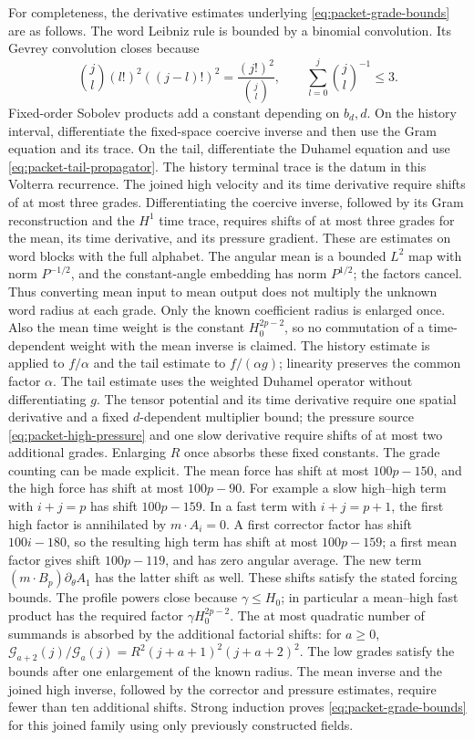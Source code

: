 \documentclass[11pt]{article}
\theoremstyle{definition}
\begin{document}
For completeness, the derivative estimates underlying
\eqref{eq:packet-grade-bounds} are as follows. The word Leibniz rule is
bounded by a binomial convolution. Its Gevrey convolution closes because
\[
 \binom jl(l!)^2((j-l)!)^2
       =\frac{(j!)^2}{\binom jl},
 \qquad \sum_{l=0}^j {\binom{j}{l}}^{-1}\le3.
\]
Fixed-order Sobolev products add a constant depending on $b_d,d$.
On the history interval, differentiate the fixed-space coercive
inverse and then use the Gram equation and its trace. On the tail,
differentiate the Duhamel equation and use
\eqref{eq:packet-tail-propagator}. The history terminal trace is the
datum in this Volterra recurrence. The joined high velocity and its time
derivative require shifts of at most three grades. Differentiating the
coercive inverse, followed by its Gram reconstruction and the $H^1$ time
trace, requires shifts of at most three grades for the mean, its time
derivative, and its pressure gradient. These are estimates on word blocks with the full
alphabet. The angular mean is a bounded $L^2$ map with norm $P^{-1/2}$,
and the constant-angle embedding has norm $P^{1/2}$; the factors cancel.
Thus converting mean input to mean output does not multiply the unknown
word radius at each grade. Only the known coefficient radius is enlarged
once. Also the mean time weight is the constant $H_0^{2p-2}$, so no
commutation of a time-dependent weight with the mean inverse is claimed.
The history estimate is applied to $f/\alpha$ and the tail estimate
to $f/(\alpha g)$; linearity preserves the common factor $\alpha$.
The tail estimate uses the weighted Duhamel operator without differentiating
$g$. The tensor potential and its time derivative require one spatial
derivative and a fixed $d$-dependent multiplier bound; the pressure
source \eqref{eq:packet-high-pressure} and one slow derivative require
shifts of at most two additional grades. Enlarging $R$ once absorbs these
fixed constants.
The grade counting can be made explicit. The mean force has shift at
most $100p-150$, and the high force has shift at most $100p-90$.
For example a slow high--high term with $i+j=p$ has shift
$100p-159$. In a fast term with $i+j=p+1$, the first high factor is
annihilated by $m\cdot A_i=0$. A first corrector factor has shift
$100i-180$, so the resulting high term has shift at most $100p-159$;
a first mean factor gives shift $100p-119$, and has zero angular average.
The new term $(m\cdot B_p)\partial_\theta A_1$ has the latter shift as
well. These shifts satisfy the stated forcing bounds. The profile powers close
because $\gamma\le H_0$; in particular a mean--high fast product has
the required factor $\gamma H_0^{2p-2}$.
The at most quadratic number of summands is absorbed by the additional
factorial shifts: for $a\ge0$,
$\mathcal G_{a+2}(j)/\mathcal G_a(j)
 =R^2(j+a+1)^2(j+a+2)^2$.
The low grades satisfy the bounds after one enlargement of the known radius.
The mean inverse and the joined high inverse, followed by the corrector
and pressure estimates, require fewer than ten additional shifts.
Strong induction proves \eqref{eq:packet-grade-bounds} for this
joined family using only previously constructed fields.
\end{document}
